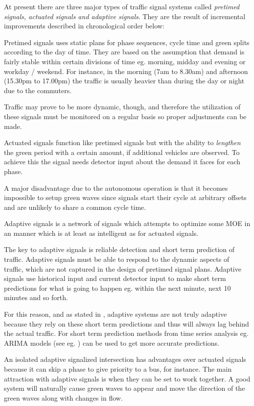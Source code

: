 \label{sec:signal_types}

At present there are three major types of traffic signal systems
called {\em pretimed signals, actuated signals and adaptive signals}. They
are the result of incremental improvements described in chronological
order below:

Pretimed signals uses static plans for phase sequences, cycle time and
green splits according to the day of time.
\label{insec:pretimed}
They are based on the assumption that demand is fairly stable within
certain divisions of time eg. morning, midday and evening or workday /
weekend. For instance, in the morning (7am to 8.30am) and afternoon
(15.30pm to 17.00pm) the traffic is usually heavier than during the
day or night due to the commuters.

Traffic may prove to be more dynamic, though, and therefore the
utilization of these signals must be monitored on a regular basis so
proper adjustments can be made.

Actuated signals function like pretimed signals but with the ability to \textit{lengthen} the green period with a certain amount, if additional vehicles are observed. 
\label{insec:actuated}
To achieve this the signal needs detector input about the demand it
faces for each phase.

A major disadvantage due to the autonomous operation is that it
becomes impossible to setup green waves since signals start their
cycle at arbitrary offsets and are unlikely to share a common cycle
time.

Adaptive signals is a network of signals which attempts to
optimize some MOE in an manner which is at least as intelligent as for
actuated signals.

The key to adaptive signals is reliable detection and short term
prediction of traffic. Adaptive signals must be able to respond to the
dynamic aspects of traffic, which are not captured in the design of
pretimed signal plans. Adaptive signals use historical input and
current detector input to make short term predictions for what is
going to happen eg. within the next minute, next 10 minutes and so
forth.

For this reason, and as stated in \cite{1}, adaptive systems are not
truly adaptive because they rely on these short term predictions and
thus will always lag behind the actual traffic. For short term
prediction methods from time series analysis eg. ARIMA models (see
eg. \cite{shortpredict}) can be used to get more accurate
predictions.

An isolated adaptive signalized intersection has advantages over
actuated signals because it can skip a phase to give priority to a
bus, for instance. The main attraction with adaptive signals is when
they can be set to work together. A good system will naturally cause
green waves to appear and move the direction of the green waves along
with changes in flow.
